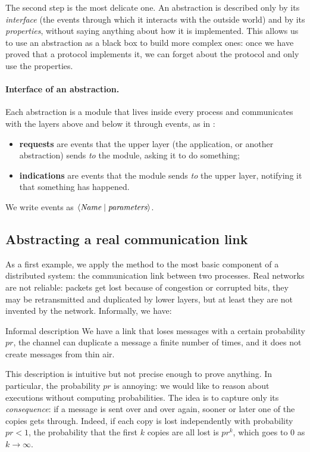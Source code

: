 The second step is the most delicate one. An abstraction is described only by its \textit{interface} (the events through which it interacts with the outside world) and by its \textit{properties}, without saying anything about how it is implemented. This allows us to use an abstraction as a black box to build more complex ones: once we have proved that a protocol implements it, we can forget about the protocol and only use the properties.

\paragraph{Interface of an abstraction.} Each abstraction is a module that lives inside every process and communicates with the layers above and below it through events, as in :
\begin{itemize}
  \item \textbf{requests} are events that the upper layer (the application, or another abstraction) sends \textit{to} the module, asking it to do something;
  \item \textbf{indications} are events that the module sends \textit{to} the upper layer, notifying it that something has happened.
\end{itemize}
We write events as $\left\langle \textit{Name} \mid \textit{parameters} \right\rangle$.

\subsection{Abstracting a real communication link}

As a first example, we apply the method to the most basic component of a distributed system: the communication link between two processes. Real networks are not reliable: packets get lost because of congestion or corrupted bits, they may be retransmitted and duplicated by lower layers, but at least they are not invented by the network. Informally, we have:

\begin{framedobs}{Informal description}
  We have a link that loses messages with a certain probability $pr$, the channel can duplicate a message a finite number of times, and it does not create messages from thin air.
\end{framedobs}

This description is intuitive but not precise enough to prove anything. In particular, the probability $pr$ is annoying: we would like to reason about executions without computing probabilities. The idea is to capture only its \textit{consequence}: if a message is sent over and over again, sooner or later one of the copies gets through. Indeed, if each copy is lost independently with probability $pr < 1$, the probability that the first $k$ copies are all lost is $pr^k$, which goes to $0$ as $k \to \infty$.

